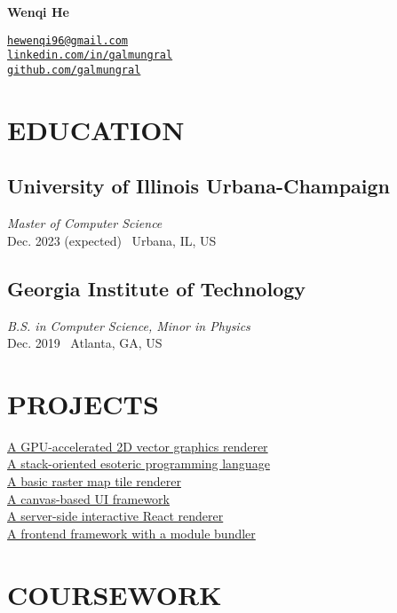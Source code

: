 \documentclass[11pt,twocolumn]{article}
\begin{document}
{\Huge\bf Wenqi He}

\vspace{10pt}
\href{mailto:hewenqi96@gmail.com}{\texttt{hewenqi96@gmail.com}}\\
\href{https://linkedin.com/in/galmungral}{\texttt{linkedin.com/in/galmungral}}\\
\href{https://github.com/galmungral}{\texttt{github.com/galmungral}}


\section*{\textnormal{EDUCATION}}

\subsection*{University of Illinois Urbana-Champaign}
\textit{Master of Computer Science}\\
Dec. 2023 (expected) \textbullet\ Urbana, IL, US

\subsection*{Georgia Institute of Technology}
\textit{B.S. in Computer Science, Minor in Physics}\\
Dec. 2019 \textbullet\ Atlanta, GA, US

\section*{\textnormal{PROJECTS}}

\href{https://github.com/galmungral/polyrender}{A GPU-accelerated 2D vector graphics renderer}\\
\href{https://github.com/galmungral/hanbun-lang}{A stack-oriented esoteric programming language} \\
\href{https://github.com/galmungral/mercator}{A basic raster map tile renderer}\\
\href{https://github.com/galmungral/michelangelo}{A canvas-based UI framework}\\
\href{https://github.com/galmungral/react-teletype}{A server-side interactive React renderer} \\
\href{https://github.com/galmungral/replay}{A frontend framework with a module bundler}

\section*{\textnormal{COURSEWORK}}
\end{document}
